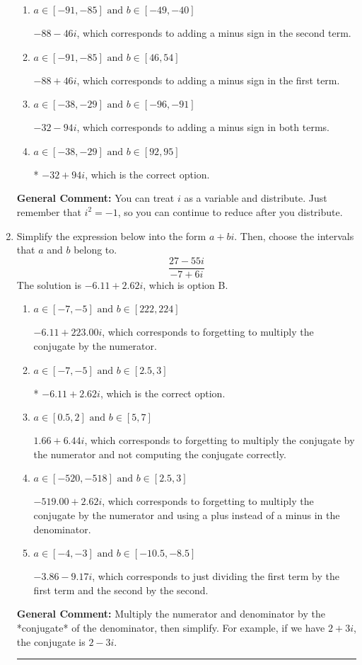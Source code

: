 \documentclass{extbook}[14pt]
\newcommand{\litem}[1]{\item #1

\rule{\textwidth}{0.4pt}}
\begin{document}
\begin{enumerate}
{\begin{enumerate}[label=\Alph*.]
 $-60 - 28 i$, which corresponds to just multiplying the real terms to get the real part of the solution and the coefficients in the complex terms to get the complex part.
\item \( a \in [-91, -85] \text{ and } b \in [-49, -40] \)

 $-88 - 46 i$, which corresponds to adding a minus sign in the second term.
\item \( a \in [-91, -85] \text{ and } b \in [46, 54] \)

 $-88 + 46 i$, which corresponds to adding a minus sign in the first term.
\item \( a \in [-38, -29] \text{ and } b \in [-96, -91] \)

 $-32 - 94 i$, which corresponds to adding a minus sign in both terms.
\item \( a \in [-38, -29] \text{ and } b \in [92, 95] \)

* $-32 + 94 i$, which is the correct option.
\end{enumerate}

\textbf{General Comment:} You can treat $i$ as a variable and distribute. Just remember that $i^2=-1$, so you can continue to reduce after you distribute.
}
\litem{
Simplify the expression below into the form $a+bi$. Then, choose the intervals that $a$ and $b$ belong to.
\[ \frac{27 - 55 i}{-7 + 6 i} \]The solution is \( -6.11  + 2.62 i \), which is option B.\begin{enumerate}[label=\Alph*.]
\item \( a \in [-7, -5] \text{ and } b \in [222, 224] \)

 $-6.11  + 223.00 i$, which corresponds to forgetting to multiply the conjugate by the numerator.
\item \( a \in [-7, -5] \text{ and } b \in [2.5, 3] \)

* $-6.11  + 2.62 i$, which is the correct option.
\item \( a \in [0.5, 2] \text{ and } b \in [5, 7] \)

 $1.66  + 6.44 i$, which corresponds to forgetting to multiply the conjugate by the numerator and not computing the conjugate correctly.
\item \( a \in [-520, -518] \text{ and } b \in [2.5, 3] \)

 $-519.00  + 2.62 i$, which corresponds to forgetting to multiply the conjugate by the numerator and using a plus instead of a minus in the denominator.
\item \( a \in [-4, -3] \text{ and } b \in [-10.5, -8.5] \)

 $-3.86  - 9.17 i$, which corresponds to just dividing the first term by the first term and the second by the second.
\end{enumerate}

\textbf{General Comment:} Multiply the numerator and denominator by the *conjugate* of the denominator, then simplify. For example, if we have $2+3i$, the conjugate is $2-3i$.
}
\end{enumerate}
\end{document}
